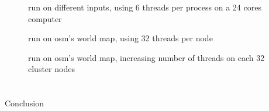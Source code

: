 \documentclass{beamer}
\begin{document}
  \begin{frame}
    \begin{figure}
      \label{graph:cmpinputs}
      \caption{run on different inputs, using 6 threads per process on a 24 cores computer}
      \subfloat{
        \scalebox{0.35}{}
      }
      \subfloat{
        \scalebox{0.35}{}
      }
    \end{figure}
  \end{frame}

  \begin{frame}
    \begin{figure}
      \caption{run on osm's world map, using 32 threads per node}
      \centering
      \scalebox{0.55}{}
    \end{figure}
  \end{frame}

  \begin{frame}
    \begin{figure}[H]
      \label{graph:planet_incthreads}
      \caption{run on osm's world map, increasing number of threads on each 32 cluster nodes}
      \centering
      \scalebox{0.55}{}
    \end{figure}
  \end{frame}

\section*{}

  \begin{frame}{Conclusion}

  \end{frame}
\end{document}
